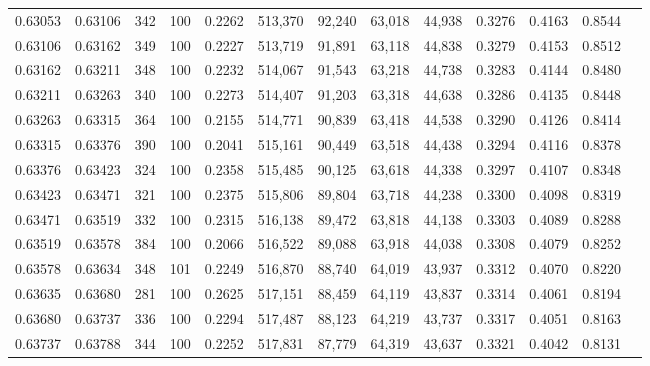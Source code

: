 \begin{tabular}{rrrrrrrrrrrrr}
0.63053 & 0.63106 &   342 & 100 &                                     0.2262 & 513,370 &  92,240 &  63,018 &  44,938 & 0.3276 & 0.4163 & 0.8544 \\
0.63106 & 0.63162 &   349 & 100 &                                     0.2227 & 513,719 &  91,891 &  63,118 &  44,838 & 0.3279 & 0.4153 & 0.8512 \\
0.63162 & 0.63211 &   348 & 100 &                                     0.2232 & 514,067 &  91,543 &  63,218 &  44,738 & 0.3283 & 0.4144 & 0.8480 \\
0.63211 & 0.63263 &   340 & 100 &                                     0.2273 & 514,407 &  91,203 &  63,318 &  44,638 & 0.3286 & 0.4135 & 0.8448 \\
0.63263 & 0.63315 &   364 & 100 &                                     0.2155 & 514,771 &  90,839 &  63,418 &  44,538 & 0.3290 & 0.4126 & 0.8414 \\
0.63315 & 0.63376 &   390 & 100 &                                     0.2041 & 515,161 &  90,449 &  63,518 &  44,438 & 0.3294 & 0.4116 & 0.8378 \\
0.63376 & 0.63423 &   324 & 100 &                                     0.2358 & 515,485 &  90,125 &  63,618 &  44,338 & 0.3297 & 0.4107 & 0.8348 \\
0.63423 & 0.63471 &   321 & 100 &                                     0.2375 & 515,806 &  89,804 &  63,718 &  44,238 & 0.3300 & 0.4098 & 0.8319 \\
0.63471 & 0.63519 &   332 & 100 &                                     0.2315 & 516,138 &  89,472 &  63,818 &  44,138 & 0.3303 & 0.4089 & 0.8288 \\
0.63519 & 0.63578 &   384 & 100 &                                     0.2066 & 516,522 &  89,088 &  63,918 &  44,038 & 0.3308 & 0.4079 & 0.8252 \\
0.63578 & 0.63634 &   348 & 101 &                                     0.2249 & 516,870 &  88,740 &  64,019 &  43,937 & 0.3312 & 0.4070 & 0.8220 \\
0.63635 & 0.63680 &   281 & 100 &                                     0.2625 & 517,151 &  88,459 &  64,119 &  43,837 & 0.3314 & 0.4061 & 0.8194 \\
0.63680 & 0.63737 &   336 & 100 &                                     0.2294 & 517,487 &  88,123 &  64,219 &  43,737 & 0.3317 & 0.4051 & 0.8163 \\
0.63737 & 0.63788 &   344 & 100 &                                     0.2252 & 517,831 &  87,779 &  64,319 &  43,637 & 0.3321 & 0.4042 & 0.8131 \\

\end{tabular}
